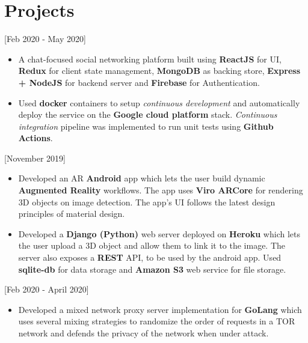 \documentclass{article}
\begin{document}
\vspace{0.5cm}
\section{Projects}

 [\normalfont{}Feb 2020 - May 2020]
\begin{itemize}
    \item A chat-focused social networking platform built using \textbf{ReactJS} for UI, \textbf{Redux} for client state management, 
    \textbf{MongoDB} as backing store, \textbf{Express + NodeJS} for backend server and \textbf{Firebase} for Authentication. 
    
    \item  Used \textbf{docker} containers to setup \emph{continuous development} and automatically deploy the service on the \textbf{Google cloud platform} stack. 
    \emph{Continuous integration} pipeline was implemented to run unit tests using \textbf{Github Actions}. 
   
\end{itemize} 

 [\normalfont{}November 2019]
\begin{itemize}
    \item Developed an AR \textbf{Android} app which lets the user build dynamic \textbf{Augmented Reality} workflows. 
    The app uses \textbf{Viro ARCore} for rendering 3D objects on image detection. 
    The app's UI follows the latest design principles of material design.
    \item Developed a \textbf{Django (Python)} web server deployed on \textbf{Heroku} which lets the user upload a 3D object and allow them to link it to the image.
     The server also exposes a \textbf{REST} API, to be used by the android app. Used \textbf{sqlite-db} 
     for data storage and \textbf{Amazon S3} web service for file storage.
\end{itemize} 

 [\normalfont{}Feb 2020 - April 2020]
\begin{itemize}
    \item Developed a mixed network proxy server implementation for \textbf{GoLang} which uses several mixing strategies 
    to randomize the order of requests in a TOR network and defends the privacy of the network when under attack.
\end{itemize} 
\end{document}

